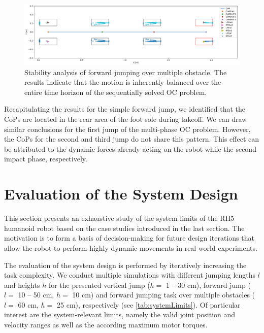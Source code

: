 \begin{figure}[h!]
\centering	
\includegraphics[width=1\textwidth]{fig/jumpObstacles/StabilityAnalysis}
\caption[Stability analysis of forward jumping over multiple obstacle]{Stability analysis of forward jumping over multiple obstacle. The results indicate that the motion is inherently balanced over the entire time horizon of the sequentially solved \gls{OC} problem.}
\label{fig:jumpObstacles_StabilityAnalysis}
\end{figure}

Recapitulating the results for the simple forward jump, we identified that the \gls{CoP}s are located in the rear area of the foot sole during takeoff. We can draw similar conclusions for the first jump of the multi-phase \gls{OC} problem. However, the \gls{CoP}s for the second and third jump do not share this pattern. This effect can be attributed to the dynamic forces already acting on the robot while the second impact phase, respectively.


\section{Evaluation of the System Design}\label{sec:HighlyEvaluation}

This section presents an exhaustive study of the system limits of the RH5 humanoid robot based on the case studies introduced in the last section. The motivation is to form a basis of decision-making for future design iterations that allow the robot to perform highly-dynamic movements in real-world experiments.

The evaluation of the system design is performed by iteratively increasing the task complexity. We conduct multiple simulations with different jumping lengths $l$ and heights $h$ for the presented vertical jump ($h=$ 1 -- 30 cm), forward jump ($l=$ 10 -- 50 cm, $h=$ 10 cm) and forward jumping task over multiple obstacles ($l=$ 60 cm, $h=$ 25 cm), respectively (see \cref{tab:systemLimits}). Of particular interest are the system-relevant limits, namely the valid  joint position and velocity ranges as well as the according maximum  motor torques. 


